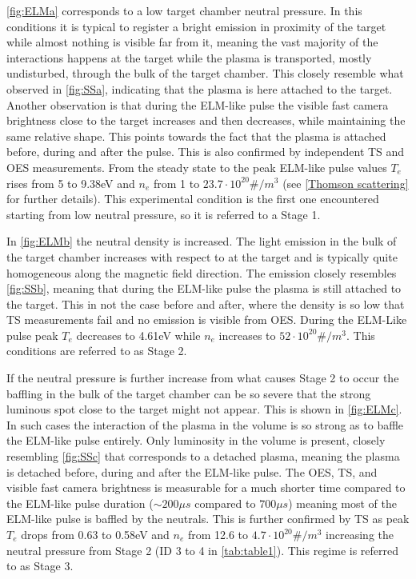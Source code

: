 \autoref{fig:ELMa} corresponds to a low target chamber neutral pressure. In this conditions it is typical to register a bright emission in proximity of the target while almost nothing is visible far from it, meaning the vast majority of the interactions happens at the target while the plasma is transported, mostly undisturbed, through the bulk of the target chamber. This closely resemble what observed in \autoref{fig:SSa}, indicating that the plasma is here attached to the target. Another observation is that during the ELM-like pulse the visible fast  camera brightness close to the target increases and then decreases, while maintaining the same relative shape. This points towards the fact that the plasma is attached before, during and after the pulse. This is also confirmed by independent TS and OES measurements. From the steady state to the peak ELM-like pulse values $T_e$ rises from 5 to 9.38eV and $n_e$ from 1 to $23.7 \cdot10^{20}\#/m^3$ (see \autoref{Thomson scattering} for further details). This experimental condition is the first one encountered starting from low neutral pressure, so it is referred to a Stage 1. 

In \autoref{fig:ELMb} the neutral density is increased. The light emission in the bulk of the target chamber increases with respect to at the target and is typically quite homogeneous along the magnetic field direction. The emission closely resembles \autoref{fig:SSb}, meaning that during the ELM-like pulse the plasma is still attached to the target. This in not the case before and after, where the density is so low that TS measurements fail and no emission is visible from OES. During the ELM-Like pulse peak $T_e$ decreases to 4.61eV while $n_e$ increases to $52 \cdot 10^{20}\#/m^3$. This conditions are referred to as Stage 2.

If the neutral pressure is further increase from what causes Stage 2 to occur the baffling in the bulk of the target chamber can be so severe that the strong luminous spot close to the target might not appear. This is shown in \autoref{fig:ELMc}. In such cases the interaction of the plasma in the volume is so strong as to baffle the ELM-like pulse entirely. Only luminosity in the volume is present, closely resembling \autoref{fig:SSc} that corresponds to a detached plasma, meaning the plasma is detached before, during and after the ELM-like pulse. The OES, TS, and visible fast camera brightness is measurable for a much shorter time compared to the ELM-like pulse duration ($\sim 200 \mu s$ compared to $700 \mu s$) meaning most of the ELM-like pulse is baffled by the neutrals. This is further confirmed by TS as peak $T_e$ drops from 0.63 to 0.58eV and $n_e$ from 12.6 to $4.7 \cdot10^{20}\#/m^3$ increasing the neutral pressure from Stage 2 (ID 3 to 4 in \autoref{tab:table1}). This regime is referred to as Stage 3.

